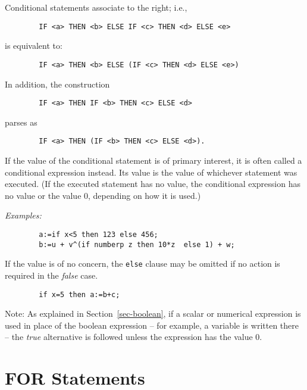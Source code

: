 Conditional statements associate to the right; i.e.,
\begin{verbatim}
        IF <a> THEN <b> ELSE IF <c> THEN <d> ELSE <e>
\end{verbatim}
is equivalent to:
\begin{verbatim}
        IF <a> THEN <b> ELSE (IF <c> THEN <d> ELSE <e>)
\end{verbatim}
In addition, the construction
\begin{verbatim}
        IF <a> THEN IF <b> THEN <c> ELSE <d>
\end{verbatim}
parses as
\begin{verbatim}
        IF <a> THEN (IF <b> THEN <c> ELSE <d>).
\end{verbatim}
If the value of the conditional statement is of primary interest, it is often called a conditional
expression instead.  Its value is the value of whichever statement was
executed. (If the executed statement has no value, the conditional
expression has no value or the value 0, depending on how it is used.)

\textit{Examples:}
\begin{verbatim}
        a:=if x<5 then 123 else 456;
        b:=u + v^(if numberp z then 10*z  else 1) + w;
\end{verbatim}
If the value is of no concern, the \texttt{else} clause may be omitted if no
action is required in the \emph{false} case.
\begin{verbatim}
        if x=5 then a:=b+c;
\end{verbatim}
Note:  As explained in Section~\ref{sec-boolean},
if a scalar or numerical expression is used in place of
the boolean expression -- for example, a variable is written there -- the
\emph{true} alternative is followed unless the expression has the value 0.

\section{FOR Statements}
\hypertarget{command:FOR}{}
\hypertarget{command:FOREACH}{}
\hypertarget{reserved:IN}{}
\hypertarget{reserved:DO}{}
\hypertarget{reserved:SUM}{}
\hypertarget{reserved:PRODUCT}{}

